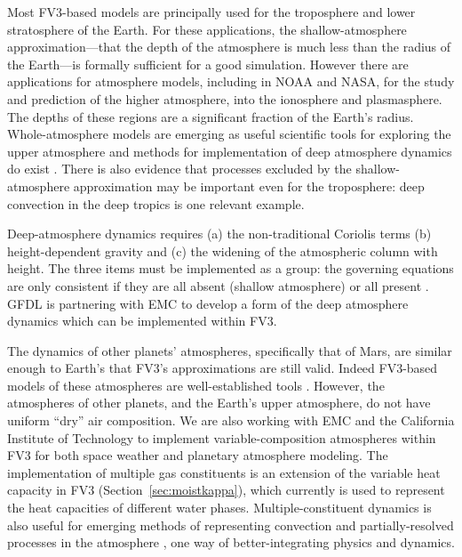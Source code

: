 \documentclass[10pt,letterpaper,margin=1in]{memoir}
\begin{document}
Most FV3-based models are principally used for the troposphere and lower stratosphere of the Earth. For these applications, the shallow-atmosphere approximation---that the depth of the atmosphere is much less than the radius of the Earth---is formally sufficient for a good simulation. However there are applications for atmosphere models, including in NOAA and NASA,  for the study and prediction of the higher atmosphere, into the ionosphere and plasmasphere. The depths of these regions are a significant fraction of the Earth's radius. Whole-atmosphere models are emerging as useful scientific tools for exploring the upper atmosphere \citep{akmaev2011} and methods for implementation of deep atmosphere dynamics do exist \citep{wood2003}. There is also evidence that processes excluded by the shallow-atmosphere approximation \citep{ong2020nontraditional,igel2020nontraditional} may be important even for the troposphere: deep convection in the deep tropics is one relevant example.

Deep-atmosphere dynamics requires (a) the non-traditional Coriolis terms (b) height-dependent gravity and (c) the widening of the atmospheric column with height. The three items must be implemented as a group: the governing equations are only consistent if they are all absent (shallow atmosphere) or all present \citep[deep atmosphere;][]{white2005consistent}. GFDL is partnering with EMC to develop a form of the deep atmosphere dynamics which can be implemented within FV3. 

The dynamics of other planets' atmospheres, specifically that of Mars, are similar enough to Earth's that FV3's approximations are still valid. Indeed FV3-based models of these atmospheres are well-established tools \citep{Wilson2011,Greybush2012}.
However, the atmospheres of other planets, and the Earth's upper atmosphere, do not have uniform ``dry'' air composition. 
We are also working with EMC and the California Institute of Technology to implement variable-composition atmospheres within FV3 \citep{LiChen2019} for both space weather and planetary atmosphere modeling. The implementation of multiple gas constituents is an extension of the variable heat capacity in FV3 (Section~\ref{sec:moistkappa}), which currently is used to represent the heat capacities of different water phases. Multiple-constituent dynamics is also useful for emerging methods of representing convection and partially-resolved processes in the atmosphere \citep{weller2020multifluids,thuburn2018properties}, one way of better-integrating physics and dynamics.
\end{document}
